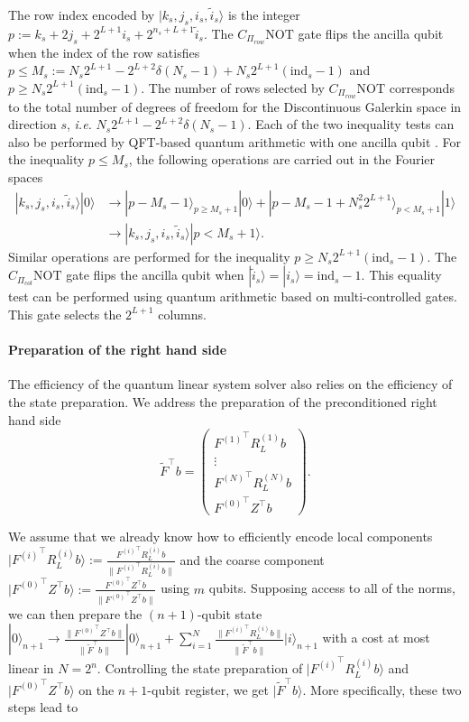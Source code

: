 \documentclass[onefignum,onetabnum]{siamart251216}
\newcommand{\ket}[1]{ | #1 \rangle}
\begin{document}
The row index encoded by $\ket{k_s,j_s,i_s,\tilde{i}_s}$ is the integer $p:=k_s + 2j_s +2^{L+1}i_s + 2^{n_s+L+1}\tilde{i}_s$.
The $C_{\Pi_{row}} \text{NOT}$ gate flips the ancilla qubit when the index of the row satisfies $p \leq M_s := N_s 2^{L+1} - 2^{L+2} \delta(N_s -1) + N_s 2^{L+1} (\text{ind}_s - 1)$ and $p \geq N_s 2^{L+1} (\text{ind}_s - 1)$. The number of rows selected by $C_{\Pi_{row}} \text{NOT}$ corresponds to the total number of degrees of freedom for the Discontinuous Galerkin space in direction $s$, \textit{i.e.} $N_s 2^{L+1} - 2^{L+2} \delta(N_s -1)$. Each of the two inequality tests can also be performed by QFT-based quantum arithmetic with one ancilla qubit \cite{Yuan_2023,10.5555/2011517.2011525}. For the inequality $p \leq M_s$, the following operations are carried out in the Fourier spaces
\begin{subequations}
\begin{align}
    \ket{k_s,j_s,i_s,\tilde{i}_s}\ket{0} &\rightarrow \ket{p - M_s - 1}_{p \geq M_s+1}\ket{0} + \ket{p - M_s -1 + N_s^2 2^{L+1}}_{p < M_s+1}\ket{1} \\
    & \rightarrow \ket{k_s,j_s,i_s,\tilde{i}_s}\ket{p < M_s+1}.
\end{align}
\end{subequations}
Similar operations are performed for the inequality $p \geq N_s 2^{L+1} (\text{ind}_s - 1)$.
The $C_{\Pi_{col}}\text{NOT}$ gate flips the ancilla qubit when $\ket{\tilde{i}_s} = \ket{i_s} = \text{ind}_s-1$. This equality test can be performed using quantum arithmetic based on multi-controlled gates. This gate selects the $2^{L+1}$ columns.

\paragraph{Preparation of the right hand side}
The efficiency of the quantum linear system solver also relies on the efficiency of the state preparation. We address the preparation of the preconditioned right hand side 
\[
{\tilde{F}}^\top b = \begin{pmatrix}
{F^{(1)}}^\top R_L^{(1)} b \\
\vdots
\\
{F^{(N)}}^\top R_L^{(N)} b \\
{F^{(0)}}^\top Z^\top b
\end{pmatrix}.
\]

We assume that we already know how to efficiently encode local components $\displaystyle \ket{{F^{(i)}}^\top R_L^{(i)} b } := \frac{{F^{(i)}}^\top R_L^{(i)} b }{\|{F^{(i)}}^\top R_L^{(i)} b \|}$ and the coarse component $\displaystyle \ket{{F^{(0)}}^\top Z^\top b } := \frac{{F^{(0)}}^\top Z^\top b }{\|{F^{(0)}}^\top Z^\top b \|}$ using $m$ qubits. Supposing access to all of the norms, we can then prepare the $(n+1)$-qubit state $\ket{0}_{n+1} \rightarrow \frac{\|{F^{(0)}}^\top Z^\top b\|}{\|{\tilde{F}}^\top b\|} \ket{0}_{n+1} + \sum_{i=1}^N \frac{\|{F^{(i)}}^\top R_L^{(i)} b\|}{\|{\tilde{F}}^\top b\|} \ket{i}_{n+1}$ with a cost at most linear in $N=2^n$. Controlling the state preparation of $\ket{{F^{(i)}}^\top R_L^{(i)} b}$ and $\ket{{F^{(0)}}^\top Z^\top b}$ on the $n+1$-qubit register, we get $\ket{\tilde{F}^\top b}$. More specifically, these two steps lead to
\end{document}
